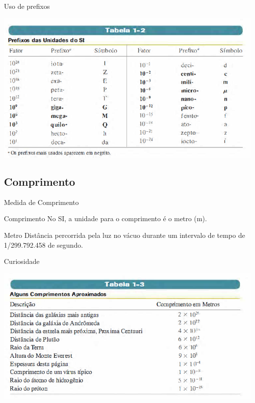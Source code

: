 \documentclass[xcolor=dvipsnames,table]{beamer}
\begin{document}
	\begin{frame}{Uso de prefixos}
		\begin{center}
			\includegraphics[scale=0.5]{images/tabela1-2.png}
		\end{center}
	\end{frame}
	
	\subsection{Comprimento}
	\begin{frame}{Medida de Comprimento}
		\begin{block}{Comprimento}
			No SI, a unidade para o comprimento é o metro (m).
		\end{block}
		\begin{block}{Metro}
			Distância percorrida pela luz no vácuo durante um intervalo de tempo de 1/299.792.458 de segundo.
		\end{block}
	\end{frame}
	
	\begin{frame}{Curiosidade}
		\begin{center}
			\includegraphics[scale=0.5]{images/tabela1-3.png}
		\end{center}
	\end{frame}
	
\end{document}
